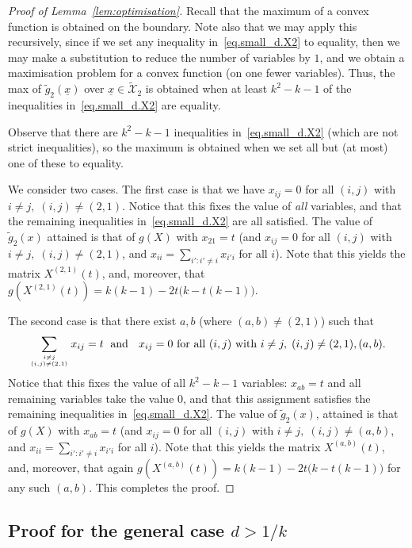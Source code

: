 \documentclass[a4paper,UKenglish,cleveref, autoref, thm-restate,numberwithinsect]{lipics-v2021}
\begin{document}
\begin{proof}[Proof of Lemma~\ref{lem:optimisation}]
Recall that the maximum of a convex function is obtained on the boundary. Note also that we may apply this recursively, since if we set any inequality in~\eqref{eq.small_d.X2} to equality, then we may make a substitution to reduce the number of variables by $1$, and we obtain a maximisation problem for a convex function (on one fewer variables). Thus, the max of $\tilde{g}_2(\underline{x})$ over $\underline{x}\in \widetilde{\mathcal{X}}_2$ is obtained when at least $k^2-k-1$ of the inequalities in~\eqref{eq.small_d.X2} are equality. 

Observe that there are $k^2-k-1$ inequalities in~\eqref{eq.small_d.X2} (which are not strict inequalities), so the maximum is obtained when we set all but (at most) one of these to equality.

We consider two cases. The first case is that we have $x_{ij}=0$ for all $(i,j)$ with $i\neq j,\; (i,j)\neq (2,1)$. Notice that this fixes the value of \emph{all} variables, and that the remaining inequalities in~\eqref{eq.small_d.X2} are all satisfied.
The value of  $\tilde{g}_2(x)$ attained is that of $g(X)$ with $x_{21}=t$ (and  $x_{ij}=0$ for all $(i,j)$ with $i\neq j,\; (i,j)\neq (2,1)$, and $x_{ii}=\sum_{i' \colon i'\neq i} x_{i' i}$ for all $i$). Note that this yields the matrix $X^{(2,1)}(t)$, and, moreover, that
$g(X^{(2,1)}(t))= k(k\!-\!1) - 2t \big( k\!-\!t(k\!-\!1)\big)$.

The second case is that there exist $a,b$ (where $(a,b)\neq (2,1)$) such that 
\[ \sum_{{i \ne j\atop (i,j)\ne (2,1)}} x_{ij} = t \; \mbox{ and }\; \mbox{
$x_{ij}=0$ for all $(i,j)$ with $i\neq j,\; (i,j)\neq (2,1), (a,b)$}.\] 
%
%
Notice that this fixes the value of all $k^2-k-1$ variables: $x_{ab}=t$ and all remaining variables take the value $0$, and that this assignment satisfies the remaining inequalities in~\eqref{eq.small_d.X2}. The value of  $\tilde{g}_2(x)$, attained is that of $g(X)$ with $x_{ab}=t$ (and  $x_{ij}=0$ for all $(i,j)$ with $i\neq j,\; (i,j)\neq (a,b)$, and $x_{ii}=\sum_{i' : i'\neq i} x_{i' i}$ for all $i$). Note that this yields the matrix $X^{(a,b)}(t)$, and, moreover, that again $g(X^{(a,b)}(t))= k(k\!-\!1) - 2t \big( k\!-\!t(k\!-\!1)\big)$ for any such $(a,b)$.
%
%
%
This completes the proof. 
\end{proof}



\subsection{Proof for the general case $d>1/k$}\label{subsec:far_mod}
\end{document}
